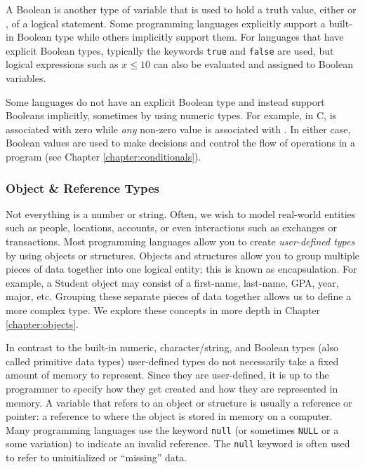 A \gls{Boolean} is another type of variable that is used to hold a truth 
value, either \True or \False, of a logical statement.  Some programming 
languages explicitly support a built-in Boolean type while others 
implicitly support them.  For languages that have explicit Boolean types, 
typically the keywords \texttt{true} and \texttt{false} 
are used, but logical expressions such as $x \leq 10$ can also be evaluated 
and assigned to Boolean variables.  

Some languages do not have an explicit Boolean type and instead support
Booleans implicitly, sometimes by using numeric types.  For example, in C, 
\False is associated with zero while \emph{any} non-zero value is associated
with \True.  In either case, Boolean values are used to make
decisions and control the flow of operations in a program (see 
Chapter \ref{chapter:conditionals}).

\subsubsection{Object \& Reference Types}

Not everything is a number or string.  Often, we wish to model real-world entities
such as people, locations, accounts, or even interactions such as exchanges or
transactions.  Most programming languages allow you to create 
\emph{user-defined types} by using objects or structures.  Objects and structures
allow you to group multiple pieces of data together into one logical
entity; this is known as  \gls{encapsulation}.  
For example, a Student object
may consist of a first-name, last-name, GPA, year, major, etc.  Grouping
these separate pieces of data together allows us to define a more complex
type.  We explore these concepts in more depth in Chapter \ref{chapter:objects}.

In contrast to the built-in numeric, character/string, and Boolean types 
(also called  \gls{primitive} data types) 
user-defined types do not necessarily take a fixed
amount of memory to represent.  Since they are user-defined, it is up to the
programmer to specify how they get created and how they are represented in
memory.  A variable that refers to an object or structure is usually a 
\gls{reference} or \gls{pointer}: a reference to where the object is stored 
in memory on a computer.  Many programming languages use the keyword 
\texttt{null}  (or sometimes
\texttt{NULL} or a some variation) to indicate an invalid reference.  
The \texttt{null} keyword is often used to refer to uninitialized or
``missing'' data.

